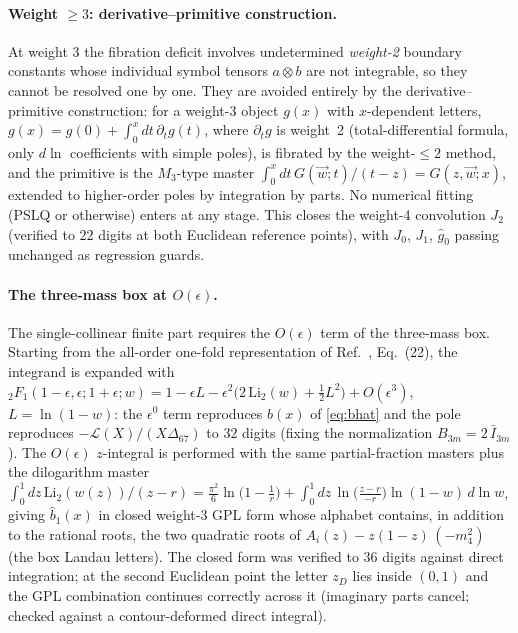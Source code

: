 \documentclass[11pt]{article}
\newcommand{\eps}{\epsilon}
\begin{document}
\paragraph{Weight $\ge3$: derivative--primitive construction.}
At weight $3$ the fibration deficit involves undetermined \emph{weight-2} boundary constants
whose individual symbol tensors $a\otimes b$ are not integrable, so they cannot be resolved
one by one. They are avoided entirely by the derivative--primitive construction: for a
weight-3 object $g(x)$ with $x$-dependent letters,
$g(x)=g(0)+\int_0^x dt\,\partial_t g(t)$, where $\partial_t g$ is weight~2 (total-differential
formula, only $d\ln$ coefficients with simple poles), is fibrated by the weight-$\le2$ method,
and the primitive is the $M_3$-type master
$\int_0^x dt\,G(\vec w;t)/(t-z)=G(z,\vec w;x)$, extended to higher-order poles by integration
by parts. No numerical fitting (PSLQ or otherwise) enters at any stage. This closes the
weight-4 convolution $J_2$ (verified to $22$ digits at both Euclidean reference points), with
$J_0$, $J_1$, $\hat g_0$ passing unchanged as regression guards.

\paragraph{The three-mass box at $O(\eps)$.}
The single-collinear finite part requires the $O(\eps)$ term of the three-mass box. Starting
from the all-order one-fold representation of Ref.~\cite{DN}, Eq.~(22), the integrand is
expanded with
${}_2F_1(1-\eps,\eps;1+\eps;w)=1-\eps L-\eps^{2}\big(2\,\mathrm{Li}_2(w)+\tfrac12L^{2}\big)
+O(\eps^{3})$, $L=\ln(1-w)$: the $\eps^{0}$ term reproduces $\hat b(x)$ of \eqref{eq:bhat} and
the pole reproduces $-\mathcal L(X)/(X\Delta_{67})$ to $32$ digits (fixing the normalization
$B_{3m}=2\,\bar I_{3m}$). The $O(\eps)$ $z$-integral is performed with the same partial-fraction
masters plus the dilogarithm master
$\int_0^1 dz\,\mathrm{Li}_2(w(z))/(z-r)
=\tfrac{\pi^2}{6}\ln\!\big(1-\tfrac1r\big)+\int_0^1 dz\,\ln\!\big(\tfrac{z-r}{-r}\big)
\ln(1-w)\,d\ln w$, giving $\hat b_1(x)$ in closed weight-3 GPL form whose alphabet contains, in
addition to the rational roots, the two quadratic roots of $A_i(z)-z(1-z)\,(-m_4^2)$
(the box Landau letters). The closed form was verified to $36$ digits against direct
integration; at the second Euclidean point the letter $z_D$ lies inside $(0,1)$ and the GPL
combination continues correctly across it (imaginary parts cancel; checked against a
contour-deformed direct integral).
\end{document}

